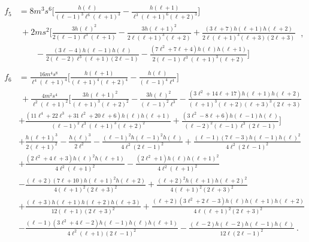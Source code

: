 \begin{subequations}[resume]
\begin{align}
    \begin{split}
        f_5 &= 8 m^3 s^6 \bigg[ \frac{h(\ell)}{(\ell-1)^3 \ell^6 (\ell+1)^3} 
        - \frac{h(\ell+1)}{\ell^3 (\ell+1)^6 (\ell+2)^3} \bigg] \\ 
        &~ + 2 m s^2 \bigg[ \frac{3 h(\ell)^2}{2 (\ell-1) \ell^3 (\ell+1)}
        - \frac{3 h(\ell+1)^2}{2 \ell (\ell+1)^3 (\ell+2)} 
        + \frac{(3 \ell+7) h(\ell+1) h(\ell+2)}{2 \ell (\ell+1)^3 (\ell+3) (2 \ell+3)} \\
        &\qquad - \frac{(3 \ell-4) h(\ell-1) h(\ell)}{ 2(\ell-2) \ell^3 (\ell+1) (2 \ell-1)} 
        - \frac{(7 \ell^2 + 7\ell + 4 ) h(\ell) h(\ell+1)}{2(\ell-1) \ell^3 (\ell+1)^3 (\ell+2)} \bigg]
    \end{split} ~,\\[0.15cm]
    \begin{split}
        f_6 &= \frac{16 m^4 s^8}{\ell^4 (\ell+1)^4} \bigg[ 
        \frac{h(\ell+1)}{(\ell+1)^4 (\ell+2)^4} 
        - \frac{h(\ell)}{(\ell-1)^4 \ell^4} \bigg] \\
        &~ + \frac{4 m^2 s^4}{\ell^2 (\ell+1)^2} \bigg[ 
        \frac{3 h(\ell+1)^2}{(\ell+1)^3 (\ell+2)^2}
        - \frac{3 h(\ell)^2}{(\ell-1)^2 \ell^3}
        - \frac{(3\ell^2+14\ell+17)h(\ell+1)h(\ell+2)}{(\ell+1)^3(\ell+2)(\ell+3)^3(2\ell+3)} \\
        & +\frac{(11\ell^4+22\ell^3+31\ell^2+20\ell+6) h(\ell)h(\ell+1)}{(\ell-1)^2 \ell^3 (\ell+1)^3 (\ell+2)^2}
        + \frac{(3\ell^2 -8\ell +6) h(\ell-1) h(\ell)}{(\ell-2)^2 (\ell-1) \ell^3 (2\ell-1)} \bigg] \\
        & + \frac{h(\ell+1)^3}{2(\ell+1)^2}
        - \frac{h(\ell)^3}{2 \ell^2} 
        -\frac{(\ell-1)^2 h(\ell-1)^2 h(\ell)}{4 \ell^2 (2 \ell-1)^2}
        +\frac{(\ell-1) (7 \ell-3) h(\ell-1) h(\ell)^2}{4 \ell^2 (2 \ell-1)^2} \\
        & +\frac{ (2 \ell^2+4 \ell+3 ) h(\ell)^2 h(\ell+1)}{4 \ell^2 (\ell+1)^2}
        -\frac{ (2 \ell^2+1 ) h(\ell) h(\ell+1)^2}{4 \ell^2 (\ell+1)^2} \\
        & -\frac{(\ell+2) (7 \ell+10) h(\ell+1)^2 h(\ell+2)}{4 (\ell+1)^2 (2 \ell+3)^2}
        +\frac{(\ell+2)^2 h(\ell+1) h(\ell+2)^2}{4 (\ell+1)^2 (2 \ell+3)^2} \\
        & +\frac{(\ell+3) h(\ell+1) h(\ell+2) h(\ell+3)}{12 (\ell+1) (2 \ell+3)^2}  
        +\frac{(\ell+2)(3 \ell^2+2 \ell-3 ) h(\ell) h(\ell+1) h(\ell+2)}{4 \ell (\ell+1)^2 (2 \ell+3)^2} \\
        & -\frac{(\ell-1)(3 \ell^2+4 \ell-2 ) h(\ell-1) h(\ell) h(\ell+1)}{4 \ell^2 (\ell+1) (2 \ell-1)^2} 
        -\frac{(\ell-2) h(\ell-2) h(\ell-1) h(\ell)}{12 \ell (2 \ell-1)^2} ~.
    \end{split}
\end{align}
\end{subequations}
